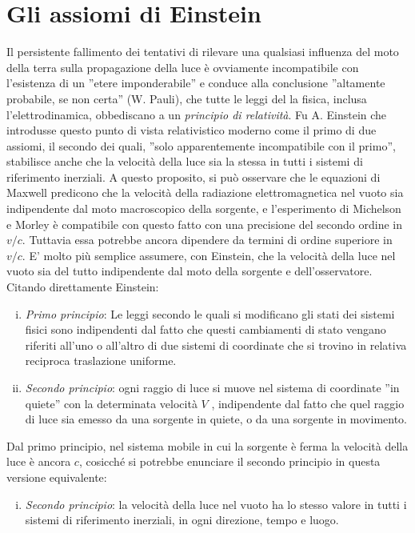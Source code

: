 \documentclass[a4paper,11pt]{book}
\theoremstyle{plain}
\theoremstyle{definition}
\begin{document}
\section{Gli assiomi di Einstein}
Il persistente fallimento dei tentativi di rilevare una qualsiasi influenza del moto della 
terra sulla propagazione della luce è ovviamente incompatibile con l'esistenza di un ''etere 
imponderabile'' e conduce alla conclusione ''altamente probabile, se non certa'' (W. Pauli), 
che tutte le leggi del la fisica, inclusa l'elettrodinamica, obbediscano a un \emph{principio di 
relatività}. Fu A. Einstein che introdusse questo punto di vista relativistico moderno come il primo di 
due assiomi, il secondo dei quali, ''solo apparentemente incompatibile con il primo'', stabilisce anche che la velocità della luce sia la stessa in tutti i sistemi di riferimento inerziali. 
A questo proposito, si può osservare che le equazioni di Maxwell predicono che la velocità 
della radiazione elettromagnetica nel vuoto sia indipendente dal moto macroscopico della 
sorgente, e l'esperimento di Michelson e Morley è compatibile con questo fatto con una 
precisione del secondo ordine in $v/c$. Tuttavia essa potrebbe ancora dipendere da termini di ordine superiore in $v/c$. E' molto più semplice assumere, con Einstein, che la velocità della luce nel vuoto sia del tutto 
indipendente dal moto della sorgente e dell'osservatore. Citando direttamente Einstein:
\begin{enumerate}[i.]
	\item \emph{Primo principio}: Le leggi secondo le quali si modificano gli stati dei sistemi fisici sono 
indipendenti dal fatto che questi cambiamenti di stato vengano riferiti all'uno 
o all'altro di due sistemi di coordinate che si trovino in relativa reciproca 
traslazione uniforme. 

	\item \emph{Secondo principio}: ogni raggio di luce si muove nel sistema di coordinate ''in quiete'' con 
la determinata velocità $V$ , indipendente dal fatto che quel raggio di luce sia 
emesso da una sorgente in quiete, o da una sorgente in movimento. 
\end{enumerate}
Dal primo principio, nel sistema mobile in cui la sorgente è ferma la velocità della luce è ancora $c$, cosicché si 
potrebbe enunciare il secondo principio in questa versione equivalente:
\begin{enumerate}[iii.]
	\item \emph{Secondo principio}: la velocità della luce nel vuoto ha lo stesso valore in tutti i sistemi di 
riferimento inerziali, in ogni direzione, tempo e luogo.
\end{enumerate} 
\end{document}
